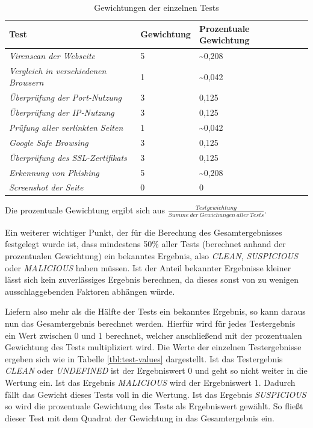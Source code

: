 \begin{table}[H]
\centering
\begin{tabular}{|l|l|l|l|}
\hline
\textbf{Test} & \textbf{Gewichtung} & \textbf{Prozentuale Gewichtung} \\\hline
\textit{Virenscan der Webseite} & 5 & \textasciitilde0,208\\\hline
\textit{Vergleich in verschiedenen Browsern} & 1 & \textasciitilde0,042\\\hline
\textit{Überprüfung der Port-Nutzung} & 3 & 0,125\\\hline
\textit{Überprüfung der IP-Nutzung} & 3 & 0,125\\\hline
\textit{Prüfung aller verlinkten Seiten} & 1 & \textasciitilde0,042\\\hline
\textit{Google Safe Browsing} & 3 & 0,125\\\hline
\textit{Überprüfung des SSL-Zertifikats} & 3 & 0,125\\\hline
\textit{Erkennung von Phishing} & 5 & \textasciitilde0,208\\\hline
\textit{Screenshot der Seite} & 0 & 0\\\hline
\end{tabular}
\caption{Gewichtungen der einzelnen Tests}
\label{tbl:test-weights}
\end{table}

Die prozentuale Gewichtung ergibt sich aus $\frac{Testgewichtung}{Summe~der~Gewichungen~aller~Tests}$.

Ein weiterer wichtiger Punkt, der für die Berechung des Gesamtergebnisses festgelegt wurde ist, dass mindestens 50\% aller Tests (berechnet anhand der prozentualen Gewichtung) ein bekanntes Ergebnis, also \textit{CLEAN}, \textit{SUSPICIOUS} oder \textit{MALICIOUS} haben müssen. Ist der Anteil bekannter Ergebnisse kleiner lässt sich kein zuverlässiges Ergebnis berechnen, da dieses sonst von zu wenigen ausschlaggebenden Faktoren abhängen würde.

Liefern also mehr als die Hälfte der Tests ein bekanntes Ergebnis, so kann daraus nun das Gesamtergebnis berechnet werden. Hierfür wird für jedes Testergebnis ein Wert zwischen 0 und 1 berechnet, welcher anschließend mit der prozentualen Gewichtung des Tests multipliziert wird. Die Werte der einzelnen Testergebnisse ergeben sich wie in Tabelle \ref{tbl:test-values} dargestellt. Ist das Testergebnis \textit{CLEAN} oder \textit{UNDEFINED} ist der Ergebniswert 0 und geht so nicht weiter in die Wertung ein. Ist das Ergebnis \textit{MALICIOUS} wird der Ergebniswert 1. Dadurch fällt das Gewicht dieses Tests voll in die Wertung. Ist das Ergebnis \textit{SUSPICIOUS} so wird die prozentuale Gewichtung des Tests als Ergebniswert gewählt. So fließt dieser Test mit dem Quadrat der Gewichtung in das Gesamtergebnis ein.

